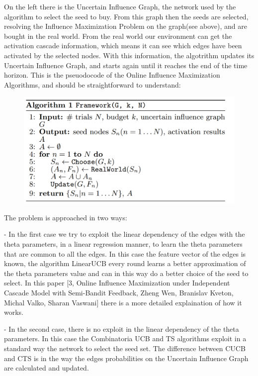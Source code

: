 On the left there is the Uncertain Influence Graph, the network used by the algorithm to select the seed to buy.
From this graph then the seeds are selected, resolving the Influence Maximization Problem on the graph(see above), and are bought in the real world.
From the real world our environment can get the activation cascade information, which means it can see which edges have been activated by the selected nodes.
With this information, the algotrithm updates its Uncertain Influence Graph, and starts again until it reaches the end of the time horizon.
This is the pseuodocode of the Online Influence Maximization Algorithms, and should be straightforward to understand:

\begin{figure}[H]
	\centering
	\includegraphics[scale=1]{img/IMG4}
\end{figure}


The problem is approached in two ways:

- In the first case we try to exploit the linear dependency of the edges with the theta parameters, in a linear regression manner, to learn the theta parameters that are common to all the edges.
In this case the feature vector of the edges is known, the algorithm LinearUCB every round learns a better approximation of the theta parameters value and can in this way do a better choice of the seed to select.
In this paper [3, Online Influence Maximization under Independent Cascade Model with Semi-Bandit Feedback, Zheng Wen, Branislav Kveton, Michal Valko, Sharan Vaswani] there is a more detailed explaination of how it works.

- In the second case, there is no exploit in the linear dependency of the theta parameters.
In this case the Combinatoria UCB and TS algorithms exploit in a standard way the network to select the seed set.
The difference between CUCB and CTS is in the way the edges probabilities on the Uncertain Influence Graph are calculated and updated.
